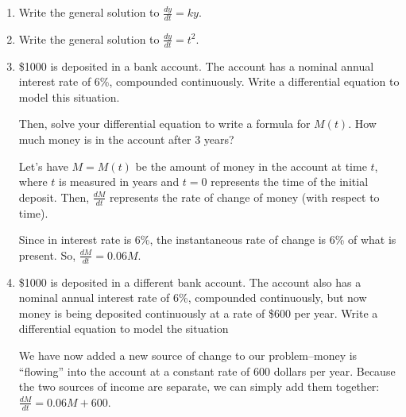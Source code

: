 \documentclass{article}
\begin{document}
\begin{enumerate}
   

    \item Write the general solution to $\frac{dy}{dt} = ky$.   \vfill 
    
    \item Write the general solution to $\frac{dy}{dt} = t^2$. \vfill


\item \begin{problem}[\vfill\vfill]
    \$1000 is deposited in a bank account.  The account has a nominal
    annual interest rate of 6\%, compounded continuously.  Write a differential equation to model this situation. 
    
    Then, solve your differential equation to write a formula for $M(t)$. How much money is in the account after 3 years? 
  \end{problem}
  \begin{solution}
    Let's have $M = M(t)$ be the amount of money in the account at time
    $t$, where $t$ is measured in years and $t = 0$ represents the time of
    the initial deposit.  Then, $\frac{dM}{dt}$ represents the rate of
    change of money (with respect to time).

    Since in interest rate is 6\%, the instantaneous rate of change is 6\% of what is present. So, $\boxed{\frac{dM}{dt} = 0.06M}$.
     
    
  \end{solution}
  
\item  \label{moneybags-compound-continuously-diffeq}



    
  \begin{problem}[\vfill]
    \$1000 is deposited in a different bank account.  The account also has a nominal annual interest rate of 6\%, compounded continuously, but now money is being deposited continuously at a rate of \$600 per year. Write a differential equation to model the situation
  \end{problem}

  \begin{solution}
    We have now added a new source of change to our problem--money is ``flowing'' into the account at a constant rate of 600 dollars per year. Because the two sources of income are separate, we can simply add them together: 
    $\boxed{\frac{dM}{dt} = 0.06M + 600}$. 
  \end{solution}


\end{enumerate}
\end{document}
